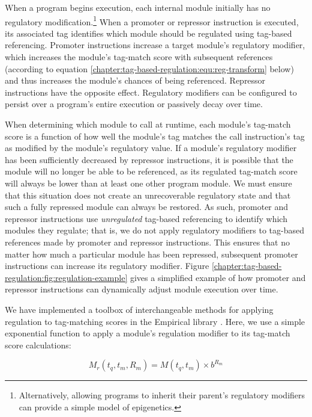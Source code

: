 When a program begins execution, each internal module initially has no regulatory modification.\footnote{
    Alternatively, allowing programs to inherit their parent's regulatory modifiers can provide a simple model of epigenetics.
}
When a promoter or repressor instruction is executed, its associated tag identifies which module should be regulated using tag-based referencing.
Promoter instructions increase a target module's regulatory modifier, which increases the module's tag-match score with subsequent references (according to equation \ref{chapter:tag-based-regulation:equ:reg-transform} below) and thus increases the module's chances of being referenced.
Repressor instructions have the opposite effect.
Regulatory modifiers can be configured to persist over a program's entire execution or passively decay over time.

When determining which module to call at runtime, each module's tag-match score is a function of how well the module's tag matches the call instruction's tag as modified by the module's regulatory value.
If a module's regulatory modifier has been sufficiently decreased by repressor instructions, it is possible that the module will no longer be able to be referenced, as its regulated tag-match score will always be lower than at least one other program module.
We must ensure that this situation does not create an unrecoverable regulatory state and that such a fully repressed module can always be restored.
As such, promoter and repressor instructions use \textit{unregulated} tag-based referencing to identify which modules they regulate; that is, we do not apply regulatory modifiers to tag-based references made by promoter and repressor instructions. 
This ensures that no matter how much a particular module has been repressed, subsequent promoter instructions can increase its regulatory modifier.
Figure \ref{chapter:tag-based-regulation:fig:regulation-example} gives a simplified example of how promoter and repressor instructions can dynamically adjust module execution over time.

We have implemented a toolbox of interchangeable methods for applying regulation to tag-matching scores in the Empirical library \citep{charles_ofria_2020_empirical}. 
Here, we use a simple exponential function to apply a module's regulation modifier to its tag-match score calculations: 

\begin{equation}
M_{r}(t_q, t_m, R_m) = M(t_q, t_m) \times b^{R_m}
\label{chapter:tag-based-regulation:equ:reg-transform}
\end{equation}

